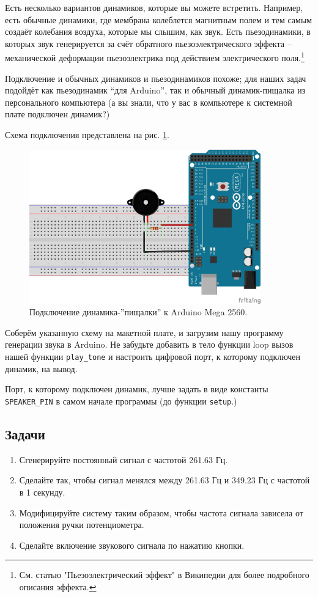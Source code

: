 \documentclass[a4paper,twoside]{book}
\begin{document}
Есть несколько вариантов динамиков, которые вы можете встретить. Например, есть
обычные динамики, где мембрана колеблется магнитным полем и тем самым создаёт
колебания воздуха, которые мы слышим, как звук. Есть пьезодинамики, в которых
звук генерируется за счёт обратного пьезоэлектрического эффекта -- механической
деформации пьезоэлектрика под действием электрического поля.\footnote{См. статью
"Пьезоэлектрический эффект" в Википедии для более подробного описания эффекта.}

Подключение и обычных динамиков и пьезодинамиков похоже; для наших задач
подойдёт как пьезодинамик ``для Arduino'', так и обычный динамик-пищалка из
персонального компьютера (а вы знали, что у вас в компьютере к системной плате
подключен динамик?)

Схема подключения представлена на рис. \ref{fig:sound-fig-2}.

\begin{figure}[h]
  \caption{Подключение динамика-''пищалки'' к Arduino Mega 2560.}
  \label{fig:sound-fig-2}
  \includegraphics[width=10cm]{sound-fig-2}
  \centering
\end{figure}

Соберём указанную схему на макетной плате, и загрузим нашу программу генерации
звука в Arduino. Не забудьте добавить в тело функции loop вызов нашей функции
\texttt{play\_tone} и настроить цифровой порт, к которому подключен динамик, на
вывод.

Порт, к которому подключен динамик, лучше задать в виде константы
\texttt{SPEAKER\_PIN} в самом начале программы (до функции \texttt{setup}.)

\subsection{Задачи}
\begin{enumerate}
\item Сгенерируйте постоянный сигнал с частотой 261.63 Гц.
\item Сделайте так, чтобы сигнал менялся между 261.63 Гц и 349.23 Гц с частотой
  в 1 секунду. 
\item Модифицируйте систему таким образом, чтобы частота сигнала зависела от
  положения ручки потенциометра. 
\item Сделайте включение звукового сигнала по нажатию кнопки.
\end{enumerate}
\end{document}
